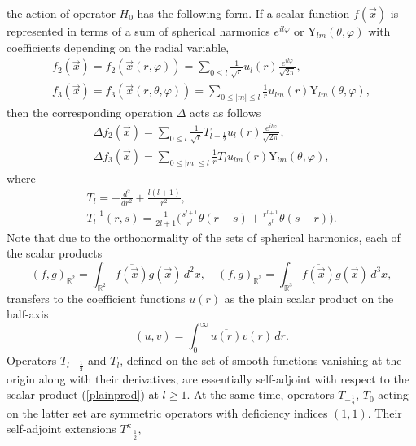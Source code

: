 \documentclass[12pt]{article}
\newcommand{\ol}{\overline}
\newcommand{\RR}{\mathbb{R}}
\newcommand{\YY}{\mathrm{Y}}
\begin{document}
	the action of operator
$ H_{0} $
	has the following form.
	If a scalar function
$ f(\vec{x}) $
	is represented in terms of a sum of spherical harmonics
$ e^{il\varphi} $ or
$ \YY_{lm}(\theta,\varphi) $
	with coefficients depending on the radial variable,
\begin{gather*}
    f_{2}(\vec{x}) = f_{2}(\vec{x}(r,\varphi)) = \sum_{0\leq l}
    \frac{1}{\sqrt{r}} u_{l}(r)
        \frac{e^{il\varphi}}{\sqrt{2\pi}} , \\
    f_{3}(\vec{x}) = f_{3}(\vec{x}(r,\theta,\varphi)) = \sum_{0\leq |m| \leq l}
    \frac{1}{r} u_{lm}(r)
        \YY_{lm}(\theta,\varphi) , 
\end{gather*}
	then the corresponding operation
$ \Delta $
	acts as follows
\begin{gather*}
    \Delta f_{2}(\vec{x})
        = \sum_{0\leq l} \frac{1}{\sqrt{r}}T_{l-\frac{1}{2}} u_{l}(r)
	    \frac{e^{il\varphi}}{\sqrt{2\pi}} , \\
    \Delta f_{3}(\vec{x})
        = \sum_{0\leq |m| \leq l} \frac{1}{r}T_{l} u_{lm}(r)
	\YY_{lm}(\theta,\varphi) ,
\end{gather*}
	where
\begin{gather}
\label{Tl}
    T_{l} = -\frac{d^{2}}{dr^{2}} + \frac{l(l+1)}{r^{2}} ,\\
\nonumber
    T_{l}^{-1}(r,s) = \frac{1}{2l+1}\bigl(\frac{s^{l+1}}{r^{l}} \theta(r-s)
	+ \frac{r^{l+1}}{s^{l}}\theta(s-r)\bigr).
\end{gather}
	Note that due to the orthonormality of the sets of spherical
	harmonics, each of the scalar products
\begin{equation*}
    (f,g)_{\RR^{2}} = \int_{\RR^{2}} \ol{f(\vec{x})} g(\vec{x}) \,d^{2}x ,
\quad
    (f,g)_{\RR^{3}} = \int_{\RR^{3}} \ol{f(\vec{x})} g(\vec{x}) \,d^{3}x ,
\end{equation*}
	transfers to the coefficient functions
$ u(r) $
	as the plain scalar product on the half-axis
\begin{equation}
\label{plainprod}
    (u,v) = \int_{0}^{\infty} \ol{u(r)} v(r) \, dr .
\end{equation}
	Operators
$ T_{l-\frac{1}{2}} $ and
$ T_{l} $,
	defined on the set of smooth functions vanishing at the origin
	along with their derivatives,
	are essentially self-adjoint with respect to the scalar product
(\ref{plainprod})
	at
$ l \geq 1 $.
	At the same time, operators
$ T_{-\frac{1}{2}} $,
$ T_{0} $
    acting on the latter set are symmetric operators with deficiency indices
$ (1,1) $.
	Their self-adjoint extensions
$ T_{-\frac{1}{2}}^{\kappa} $,
\end{document}

